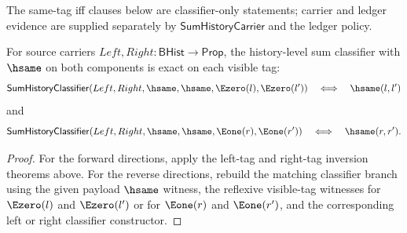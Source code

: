 The same-tag iff clauses below are classifier-only statements; carrier and ledger evidence are supplied separately by $\mathsf{SumHistoryCarrier}$ and the ledger policy.

\begin{theorem}
\label{thm:sum-history-classifier-same-tag-exactness}
For source carriers $Left,Right:\mathsf{BHist}\to\mathsf{Prop}$, the history-level sum
classifier with $\hsame$ on both components is exact on each visible tag:
$$
\mathsf{SumHistoryClassifier}(Left,Right,\hsame,\hsame,\Ezero(l),\Ezero(l'))
\quad\Longleftrightarrow\quad
\hsame(l,l')
$$
and
$$
\mathsf{SumHistoryClassifier}(Left,Right,\hsame,\hsame,\Eone(r),\Eone(r'))
\quad\Longleftrightarrow\quad
\hsame(r,r').
$$
\end{theorem}
\begin{proof}
For the forward directions, apply the left-tag and right-tag inversion
theorems above. For the reverse directions, rebuild the matching classifier
branch using the given payload $\hsame$ witness, the reflexive visible-tag
witnesses for $\Ezero(l)$ and $\Ezero(l')$ or for $\Eone(r)$ and
$\Eone(r')$, and the corresponding left or right classifier constructor.
\end{proof}

